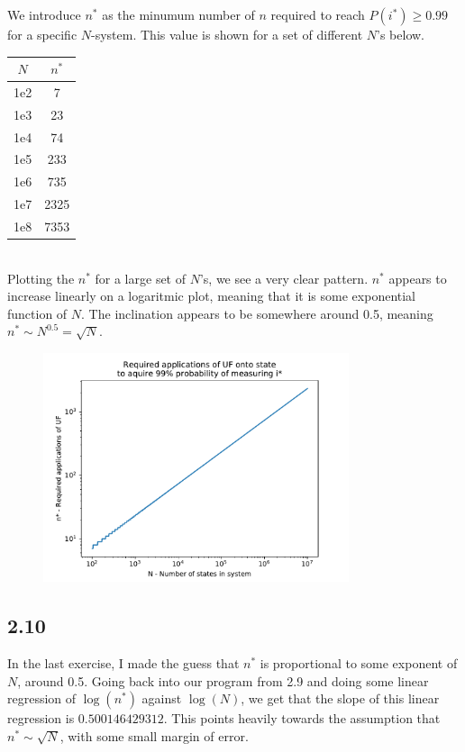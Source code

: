\documentclass[12p,a4paper]{article}
\newcommand{\0}{\ket{0}}
\newcommand{\1}{\ket{1}}
\begin{document}
We introduce $n^*$ as the minumum number of $n$ required to reach $P(i^*) \geq 0.99$ for a specific $N$-system. This value is shown for a set of different $N$'s below.

\begin{tabular}{|c|c|}
    \hline
    $N$	& $n^*$\\
    \hline
    1e2 & 7 \\
	1e3 & 23 \\
	1e4 & 74 \\
	1e5 & 233 \\
	1e6 & 735 \\
	1e7 & 2325 \\
    1e8 & 7353 \\
    \hline
\end{tabular}
\\

Plotting the $n^*$ for a large set of $N$'s, we see a very clear pattern. $n^*$ appears to increase linearly on a logaritmic plot, meaning that it is some exponential function of $N$. The inclination appears to be somewhere around 0.5, meaning $n^* \sim N^{0.5} = \sqrt{N}$.

\begin{figure}[H]
    \centering
    \includegraphics[width=0.8\textwidth]{n_star.pdf}
\end{figure}



\subsection*{2.10}
In the last exercise, I made the guess that $n^*$ is proportional to some exponent of $N$, around 0.5. Going back into our program from 2.9 and doing some linear regression of $\log(n^*)$ against $\log(N)$, we get that the slope of this linear regression is $0.500146429312$. This points heavily towards the assumption that $n^* \sim \sqrt{N}$, with some small margin of error.
\end{document}
